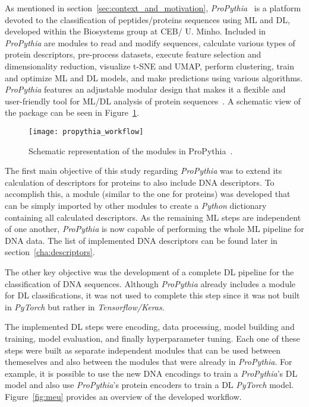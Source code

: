 As mentioned in section~\ref{sec:context_and_motivation}, \textit{ProPythia}~\cite{Sequeira2020ProPythia:Learning} is a platform devoted to the classification of peptides/proteins sequences using \gls{ML} and \gls{DL}, developed within the Biosystems group at CEB/ U. Minho. Included in \textit{ProPythia} are modules to read and modify sequences, calculate various types of protein descriptors, pre-process datasets, execute feature selection and dimensionality reduction, visualize t-SNE and UMAP, perform clustering, train and optimize \gls{ML} and \gls{DL} models, and make predictions using various algorithms. \textit{ProPythia} features an adjustable modular design that makes it a flexible and user-friendly tool for \gls{ML}/\gls{DL} analysis of protein sequences~\cite{Sequeira2020ProPythia:Learning}. A schematic view
of the package can be seen in Figure~\ref{fig:propythia_workflow}.

\begin{figure}[htbp]
    \centering
    \texttt{[image: propythia\_workflow]}
    \caption{Schematic representation of the modules in ProPythia~\cite{Sequeira2020ProPythia:Learning}.}
    \label{fig:propythia_workflow}
\end{figure}

The first main objective of this study regarding \textit{ProPythia} was to extend its calculation of descriptors for proteins to also include \gls{DNA} descriptors. To accomplish this, a module (similar to the one for proteins) was developed that can be simply imported by other modules to create a \textit{Python} dictionary containing all calculated descriptors. As the remaining \gls{ML} steps are independent of one another, \textit{ProPythia} is now capable of performing the whole \gls{ML} pipeline for \gls{DNA} data. The list of implemented \gls{DNA} descriptors can be found later in section~\ref{cha:descriptors}.

The other key objective was the development of a complete \gls{DL} pipeline for the classification of \gls{DNA} sequences. Although \textit{ProPythia} already includes a module for \gls{DL} classifications, it was not used to complete this step since it was not built in \textit{PyTorch} but rather in \textit{Tensorflow/Keras}.

The implemented \gls{DL} steps were encoding, data processing, model building and training, model evaluation, and finally hyperparameter tuning. Each one of these steps were built as separate independent modules that can be used between themeselves and also between the modules that were already in \textit{ProPythia}. For example, it is possible to use the new \gls{DNA} encodings to train a \textit{ProPythia}'s \gls{DL} model and also use \textit{ProPythia}'s protein encoders to train a \gls{DL} \textit{PyTorch} model. Figure~\ref{fig:meu} provides an overview of the developed workflow.

